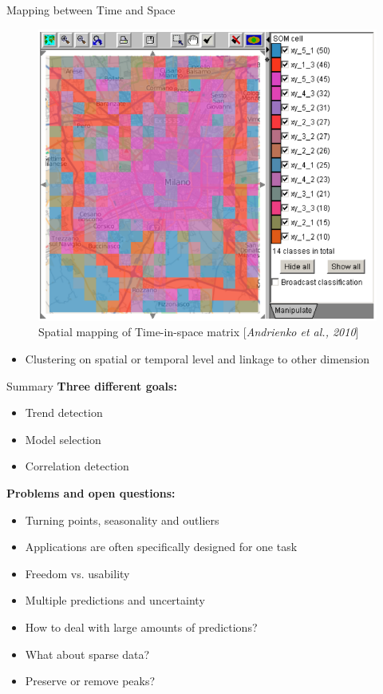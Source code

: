 \documentclass[10pt]{beamer}
\begin{document}
\begin{frame}{Mapping between Time and Space}
\begin{minipage}[t]{0.475\textwidth}
\begin{figure}[htbp]
			\includegraphics[width=\textwidth]{images/SOM_map}
			\caption{Spatial mapping of Time-in-space matrix [\textit{Andrienko et al., 2010}]}
		\end{figure}
	\end{minipage}
	\begin{itemize}
		\item Clustering on spatial or temporal level and linkage to other dimension
	\end{itemize}
\end{frame}


\begin{frame}{Summary}
	\textbf{Three different goals:}
	\begin{itemize}
		\item Trend detection
		\item Model selection 
		\item Correlation detection 
	\end{itemize}
	\vfill
	\textbf{Problems and open questions:}
	\begin{itemize}
		\item Turning points, seasonality and outliers
		\item Applications are often specifically designed for one task
		\item Freedom vs. usability
		\item Multiple predictions and uncertainty
		\item How to deal with large amounts of predictions?
		\item What about sparse data?
		\item Preserve or remove peaks?
	\end{itemize}
\end{frame}
\end{document}
